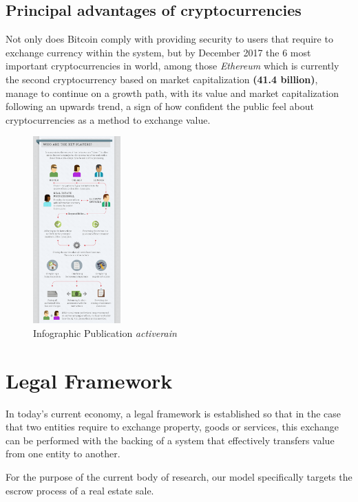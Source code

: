 \documentclass[submission,copyright,creativecommons]{eptcs}
\begin{document}
\subsection{Principal advantages of cryptocurrencies}
Not only does Bitcoin comply with providing security to users that require to exchange currency within the system, but by December 2017\cite{MostImportantCryptocurrencies} the 6 most important cryptocurrencies in world, among those \textit{Ethereum} which is currently the second cryptocurrency based on market capitalization \textbf{(41.4 billion)}, manage to continue on a growth path, with its value and market capitalization following an upwards trend, a sign of how confident the public feel about cryptocurrencies as a method to exchange value.

\begin{figure}
    \centering
    \includegraphics[width=0.30\textwidth]{infog-what-is-escrow_detail.png}
    \caption{Infographic\cite{rainmaker2WhatEscrowWhen} Publication \textit{activerain}}
\end{figure}
\vspace{3cm}
\section{Legal Framework}
In today's current economy, a legal framework is established so that in the case that two entities require to exchange property, goods or services, this exchange can be performed with the backing of a system that effectively transfers value from one entity to another.

For the purpose of the current body of research, our model specifically targets the escrow process of a real estate sale. 
\end{document}
